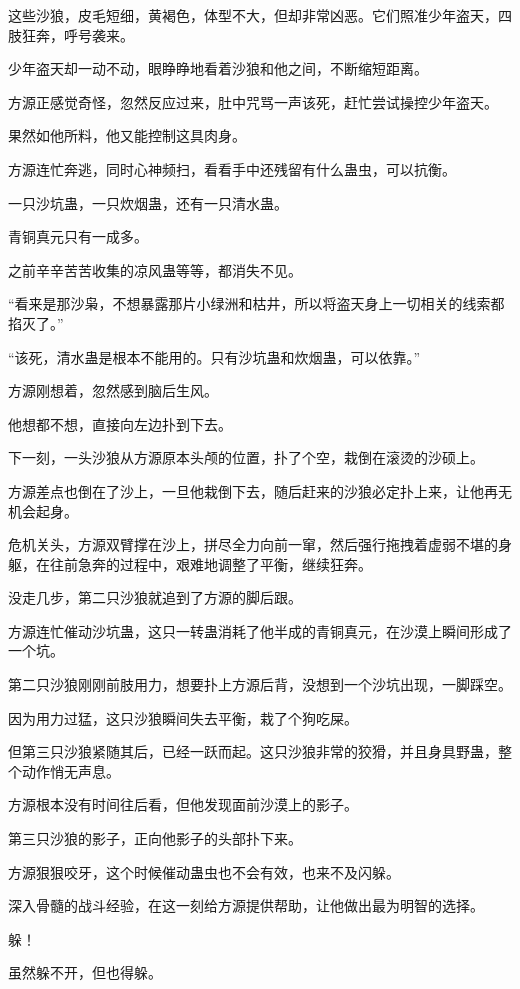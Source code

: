 \begin{this_body}
这些沙狼，皮毛短细，黄褐色，体型不大，但却非常凶恶。它们照准少年盗天，四肢狂奔，呼号袭来。

少年盗天却一动不动，眼睁睁地看着沙狼和他之间，不断缩短距离。

方源正感觉奇怪，忽然反应过来，肚中咒骂一声该死，赶忙尝试操控少年盗天。

果然如他所料，他又能控制这具肉身。

方源连忙奔逃，同时心神频扫，看看手中还残留有什么蛊虫，可以抗衡。

一只沙坑蛊，一只炊烟蛊，还有一只清水蛊。

青铜真元只有一成多。

之前辛辛苦苦收集的凉风蛊等等，都消失不见。

“看来是那沙枭，不想暴露那片小绿洲和枯井，所以将盗天身上一切相关的线索都掐灭了。”

“该死，清水蛊是根本不能用的。只有沙坑蛊和炊烟蛊，可以依靠。”

方源刚想着，忽然感到脑后生风。

他想都不想，直接向左边扑到下去。

下一刻，一头沙狼从方源原本头颅的位置，扑了个空，栽倒在滚烫的沙硕上。

方源差点也倒在了沙上，一旦他栽倒下去，随后赶来的沙狼必定扑上来，让他再无机会起身。

危机关头，方源双臂撑在沙上，拼尽全力向前一窜，然后强行拖拽着虚弱不堪的身躯，在往前急奔的过程中，艰难地调整了平衡，继续狂奔。

没走几步，第二只沙狼就追到了方源的脚后跟。

方源连忙催动沙坑蛊，这只一转蛊消耗了他半成的青铜真元，在沙漠上瞬间形成了一个坑。

第二只沙狼刚刚前肢用力，想要扑上方源后背，没想到一个沙坑出现，一脚踩空。

因为用力过猛，这只沙狼瞬间失去平衡，栽了个狗吃屎。

但第三只沙狼紧随其后，已经一跃而起。这只沙狼非常的狡猾，并且身具野蛊，整个动作悄无声息。

方源根本没有时间往后看，但他发现面前沙漠上的影子。

第三只沙狼的影子，正向他影子的头部扑下来。

方源狠狠咬牙，这个时候催动蛊虫也不会有效，也来不及闪躲。

深入骨髓的战斗经验，在这一刻给方源提供帮助，让他做出最为明智的选择。

躲！

虽然躲不开，但也得躲。


\end{this_body}
